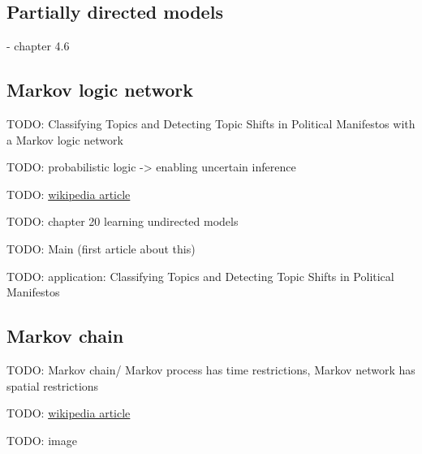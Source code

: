 \subsection{Partially directed models}

- chapter 4.6


\subsection{Markov logic network}

\cite{richardson2006markov}

TODO: Classifying Topics and Detecting Topic Shifts in Political Manifestos with a Markov logic network \cite{zirn2016classifying}

TODO: probabilistic logic -> enabling uncertain inference

TODO: \href{https://en.wikipedia.org/wiki/Markov_logic_network}{wikipedia article}

TODO: \cite{koller2009probabilistic} chapter 20 learning undirected models

TODO: Main (first article about this) \cite{richardson2006markov}

TODO: application: Classifying Topics and Detecting Topic Shifts in Political Manifestos \cite{zirn2016classifying}

\subsection{Markov chain}

TODO: Markov chain/ Markov process has time restrictions, Markov network has spatial restrictions

TODO: \href{https://en.wikipedia.org/wiki/Markov_chain}{wikipedia article}

TODO: image



